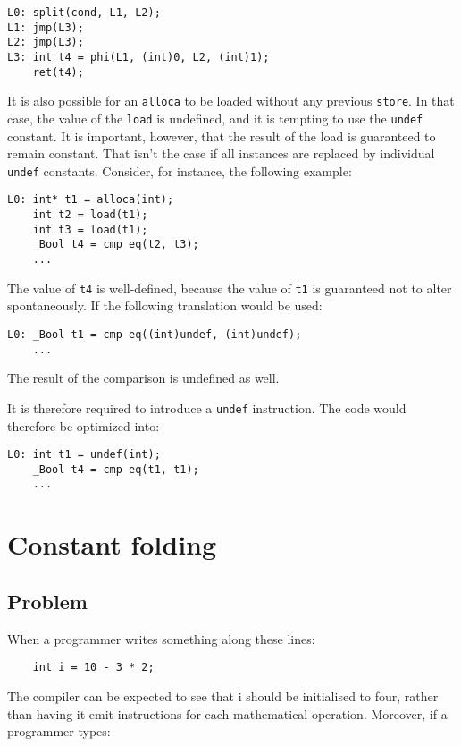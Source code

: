 \documentclass[12pt, a4paper]{article}
\begin{document}
\begin{lstlisting}
L0:	split(cond, L1, L2);
L1:	jmp(L3);
L2:	jmp(L3);
L3:	int t4 = phi(L1, (int)0, L2, (int)1);
	ret(t4);
\end{lstlisting}

It is also possible for an \verb+alloca+ to be loaded without any previous 
\verb+store+. In that case, the value of the \verb+load+ is undefined, and it is 
tempting to use the \verb+undef+ constant. It is important, however, that the 
result of the load is guaranteed to remain constant. That isn't the case if all 
instances are replaced by individual \verb+undef+ constants. Consider, for 
instance, the following example:

\begin{lstlisting}
L0:	int* t1 = alloca(int);
	int t2 = load(t1);
	int t3 = load(t1);
	_Bool t4 = cmp eq(t2, t3);
	...
\end{lstlisting}

The value of \verb+t4+ is well-defined, because the value of \verb+t1+ is
guaranteed not to alter spontaneously. If the following translation would be 
used:

\begin{lstlisting}
L0:	_Bool t1 = cmp eq((int)undef, (int)undef);
	...
\end{lstlisting}

The result of the comparison is undefined as well.

It is therefore required to introduce a \verb+undef+ instruction. The code would 
therefore be
optimized into:

\begin{lstlisting}
L0:	int t1 = undef(int);
	_Bool t4 = cmp eq(t1, t1);
	...
\end{lstlisting}


\section{Constant folding}
\subsection{Problem}
When a programmer writes something along these lines:

\begin{lstlisting}
	int i = 10 - 3 * 2;
\end{lstlisting}

The compiler can be expected to see that i should be initialised to four, rather 
than having it emit instructions for each mathematical operation. Moreover, if a 
programmer types:
\end{document}
